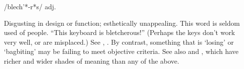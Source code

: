  /blech'*-r*s/ adj.

Disgusting in design or function; esthetically unappealing. This word is seldom
used of people. ``This keyboard is bletcherous!'' (Perhaps the keys don't work
very well, or are misplaced.) See , . By
contrast, something that is `losing' or `bagbiting' may be failing to meet
objective criteria. See also  and , which
have richer and wider shades of meaning than any of the above.

